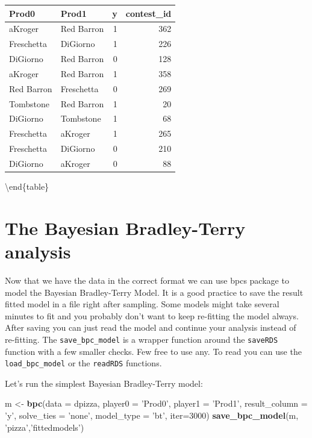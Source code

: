 \documentclass[
]{book}
\newenvironment{Shaded}{\begin{snugshade}}{\end{snugshade}}
\newcommand{\DataTypeTok}[1]{\textcolor[rgb]{0.13,0.29,0.53}{#1}}
\newcommand{\DecValTok}[1]{\textcolor[rgb]{0.00,0.00,0.81}{#1}}
\newcommand{\KeywordTok}[1]{\textcolor[rgb]{0.13,0.29,0.53}{\textbf{#1}}}
\newcommand{\NormalTok}[1]{#1}
\newcommand{\StringTok}[1]{\textcolor[rgb]{0.31,0.60,0.02}{#1}}
\begin{document}
\begin{tabular}[t]{l|l|r|r}
\hline
Prod0 & Prod1 & y & contest\_id\\
\hline
aKroger & Red Barron & 1 & 362\\
\hline
Freschetta & DiGiorno & 1 & 226\\
\hline
DiGiorno & Red Barron & 0 & 128\\
\hline
aKroger & Red Barron & 1 & 358\\
\hline
Red Barron & Freschetta & 0 & 269\\
\hline
Tombstone & Red Barron & 1 & 20\\
\hline
DiGiorno & Tombstone & 1 & 68\\
\hline
Freschetta & aKroger & 1 & 265\\
\hline
Freschetta & DiGiorno & 0 & 210\\
\hline
DiGiorno & aKroger & 0 & 88\\
\hline
\end{tabular}

\textbackslash end\{table\}

\hypertarget{the-bayesian-bradley-terry-analysis}{%
\section{The Bayesian Bradley-Terry analysis}\label{the-bayesian-bradley-terry-analysis}}

Now that we have the data in the correct format we can use bpcs package to model the Bayesian Bradley-Terry Model. It is a good practice to save the result fitted model in a file right after sampling. Some models might take several minutes to fit and you probably don't want to keep re-fitting the model always. After saving you can just read the model and continue your analysis instead of re-fitting. The \texttt{save\_bpc\_model} is a wrapper function around the \texttt{saveRDS} function with a few smaller checks. Few free to use any. To read you can use the \texttt{load\_bpc\_model} or the \texttt{readRDS} functions.

Let's run the simplest Bayesian Bradley-Terry model:

\begin{Shaded}
\begin{Highlighting}[]
\NormalTok{m <-}\StringTok{ }\KeywordTok{bpc}\NormalTok{(}\DataTypeTok{data =}\NormalTok{ dpizza,}
         \DataTypeTok{player0 =} \StringTok{'Prod0'}\NormalTok{,}
         \DataTypeTok{player1 =} \StringTok{'Prod1'}\NormalTok{,}
         \DataTypeTok{result_column =} \StringTok{'y'}\NormalTok{,}
         \DataTypeTok{solve_ties =} \StringTok{'none'}\NormalTok{,}
         \DataTypeTok{model_type =} \StringTok{'bt'}\NormalTok{,}
         \DataTypeTok{iter=}\DecValTok{3000}\NormalTok{)}
\KeywordTok{save_bpc_model}\NormalTok{(m, }\StringTok{'pizza'}\NormalTok{,}\StringTok{'fittedmodels'}\NormalTok{)}
\end{Highlighting}
\end{Shaded}
\end{document}
